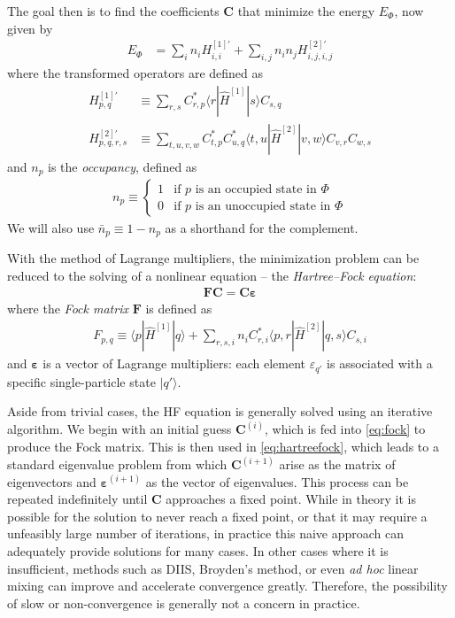 The goal then is to find the coefficients $\bm C$ that minimize the energy $E_{\Phi}$, now given by
\begin{align}
  E_{\Phi} &= \sum_i n_i H^{[1] \prime}_{i, i} + \sum_{i, j} n_i n_j H^{[2] \prime}_{i, j, i, j} \label{eq:hfenergy}
\end{align}
where the transformed operators are defined as
\begin{align}
  H^{[1] \prime}_{p, q} &\equiv \sum_{r, s} C_{r, p}^* \langle r | \hat{H}^{[1]} | s \rangle C_{s, q}^{} \label{eq:hftransform1} \\
  H^{[2] \prime}_{p, q, r, s} &\equiv \sum_{t, u, v, w} C_{t, p}^* C_{u, q}^* \langle t, u | \hat{H}^{[2]} | v, w \rangle C_{v, r}^{} C_{w, s}^{} \label{eq:hftransform2}
\end{align}
and $n_p$ is the \textit{occupancy}, defined as
\begin{align}
  n_p \equiv \begin{cases}
    1 & \text{if $p$ is an occupied state in $\Phi$} \\
    0 & \text{if $p$ is an unoccupied state in $\Phi$}
  \end{cases}
\end{align}
We will also use $\bar n_p \equiv 1 - n_p$ as a shorthand for the complement.

With the method of Lagrange multipliers, the minimization problem can be reduced to the solving of a nonlinear equation -- the \textit{Hartree--Fock equation}:
\begin{align} \label{eq:hartreefock}
  \bm{F} \bm{C} = \bm{C} \bm{\varepsilon}
\end{align}
where the \textit{Fock matrix} $\bm F$ is defined as
\begin{align} \label{eq:fock}
  F_{p, q} \equiv \langle p | \hat{H}^{[1]} | q \rangle + \sum_{r, s, i} n_i C_{r, i}^* \langle p, r | \hat{H}^{[2]} | q, s \rangle C_{s, i}^{}
\end{align}
and $\bm{\varepsilon}$ is a vector of Lagrange multipliers: each element $\varepsilon_{q'}$ is associated with a specific single-particle state $|q'\rangle$.

Aside from trivial cases, the HF equation is generally solved using an iterative algorithm.  We begin with an initial guess $\bm{C}^{(i)}$, which is fed into \eqref{eq:fock} to produce the Fock matrix.  This is then used in \eqref{eq:hartreefock}, which leads to a standard eigenvalue problem from which $\bm{C}^{(i + 1)}$ arise as the matrix of eigenvectors and $\bm{\varepsilon}^{(i + 1)}$ as the vector of eigenvalues.  This process can be repeated indefinitely until $\bm{C}$ approaches a fixed point.  While in theory it is possible for the solution to never reach a fixed point, or that it may require a unfeasibly large number of iterations, in practice this naive approach can adequately provide solutions for many cases.  In other cases where it is insufficient, methods such as DIIS, Broyden's method, or even \textit{ad hoc} linear mixing can improve and accelerate convergence greatly.  Therefore, the possibility of slow or non-convergence is generally not a concern in practice.

